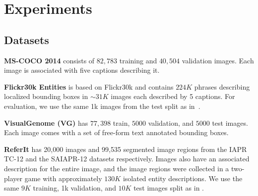 \documentclass[10pt,twocolumn,letterpaper]{article}
\newcommand\secvspace{\vspace{-0.0cm}}
\begin{document}
\section{Experiments}\label{sec:experiments}
\secvspace
\subsection{Datasets}\label{sec:datasets}
\secvspace
\noindent\textbf{MS-COCO 2014} \cite{lin2014microsoft} consists of $82,783$ training and $40,504$ validation images. Each image is associated
with five captions describing it.

\noindent\textbf{Flickr30k Entities} \cite{plummer2015flickr30k} is based on Flickr30k \cite{young2014image} and contains $224K$ phrases describing localized bounding boxes in $\sim31K$ images each described by 5 captions. 
For evaluation, we use the same 1k images from the test split as in~\cite{akbari2019multi}.

\noindent\textbf{VisualGenome (VG)} \cite{krishna2017visual} has $77,398$ train, $5000$ validation, and $5000$ test images. Each image comes with a set of free-form text annotated bounding boxes.

\noindent\textbf{ReferIt} has 20,000 images and 99,535 segmented image regions from the IAPR TC-12 \cite{grubinger2006iapr} and the SAIAPR-12 datasets \cite{chen2017query} respectively. Images also have an associated description for the entire image, and the image regions were collected in a two-player game \cite{kazemzadeh2014referitgame} with approximately $130K$ isolated entity descriptions. We use the same $9K$ training, 1k validation, and $10K$ test images split as in \cite{akbari2019multi}. \secvspace
\end{document}
